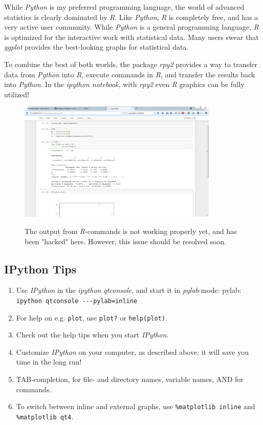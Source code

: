 While \emph{Python} is my preferred programming language, the world of advanced statistics is clearly dominated by \emph{R}. Like \emph{Python}, \emph{R} is completely free, and has a very active user community. While \emph{Python} is a general programming language, \emph{R} is optimized for the interactive work with statistical data. Many users swear that \emph{ggplot} provides the best-looking graphs for statistical data.

To combine the best of both worlds, the package \emph{rpy2} provides a way to transfer data from \emph{Python} into \emph{R}, execute commands in \emph{R}, and transfer the results back into \emph{Python}. In the \emph{ipython notebook}, with \emph{rpy2} even \emph{R} graphics can be fully utilized!

\begin{figure}
  \centering
  \includegraphics[width=0.85\textwidth]{../Images/ipython-rmagic.png}\\
  \caption{The output from \emph{R}-commands is not working properly yet, and has been "hacked" here. However, this issue should be resolved soon.}
\end{figure}

\subsection{IPython Tips}

\begin{enumerate}
    \item Use \emph{IPython} in the \emph{ipython qtconsole}, and start it in \emph{pylab}-mode: pylab: \lstinline{ipython qtconsole ---pylab=inline}
    \item For help on e.g. \lstinline{plot}, use \lstinline{plot?} or \lstinline{help(plot)}.
    \item Check out the help tips when you start \emph{IPython}.
    \item Customize \emph{IPython} on your computer, as described above: it will save you time in the long run!
    \item TAB-completion, for file- and directory names, variable names, AND for commands.
    \item To switch between inline and external graphs, use \; \lstinline{%matplotlib inline} and \; \lstinline{%matplotlib qt4}.
\end{enumerate}

